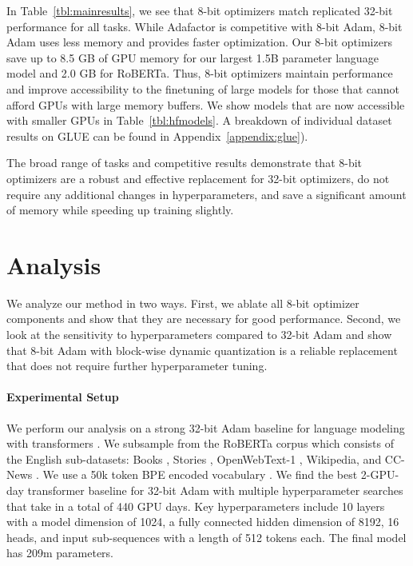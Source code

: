 In Table~\ref{tbl:mainresults}, we see that 8-bit optimizers match replicated 32-bit performance for all tasks. While Adafactor is competitive with 8-bit Adam, 8-bit Adam uses less memory and provides faster optimization. Our 8-bit optimizers save up to 8.5 GB of GPU memory for our largest 1.5B parameter language model and 2.0 GB for RoBERTa. Thus, 8-bit optimizers maintain performance and improve accessibility to the finetuning of large models for those that cannot afford GPUs with large memory buffers. We show models that are now accessible with smaller GPUs in Table~\ref{tbl:hfmodels}. A breakdown of individual dataset results on GLUE can be found in Appendix~\ref{appendix:glue}).

The broad range of tasks and competitive results demonstrate that 8-bit optimizers are a robust and effective replacement for 32-bit optimizers, do not require any additional changes in hyperparameters, and save a significant amount of memory while speeding up training slightly.

\section{Analysis}
\label{sec:ablations}

We analyze our method in two ways. First, we ablate all 8-bit optimizer components and show that they are necessary for good performance. Second, we look at the sensitivity to hyperparameters compared to 32-bit Adam and show that 8-bit Adam with block-wise dynamic quantization is a reliable replacement that does not require further hyperparameter tuning.

\paragraph{Experimental Setup} We perform our analysis on a strong 32-bit Adam baseline for language modeling with transformers \citep{vaswani2017attention}. We subsample from the RoBERTa corpus \citep{liu2019roberta} which consists of the English sub-datasets: Books \citep{zhu2015aligning}, Stories \citep{trinh2018simple}, OpenWebText-1 \citep{Gokaslan2019OpenWeb}, Wikipedia, and CC-News \citep{nagel2016cc}. We use a 50k token BPE encoded vocabulary \citep{sennrich2015neural}. We find the best 2-GPU-day transformer baseline for 32-bit Adam with multiple hyperparameter searches that take in a total of 440 GPU days. Key hyperparameters include 10 layers with a model dimension of 1024, a fully connected hidden dimension of 8192, 16 heads, and input sub-sequences with a length of 512 tokens each. The final model has 209m parameters.

